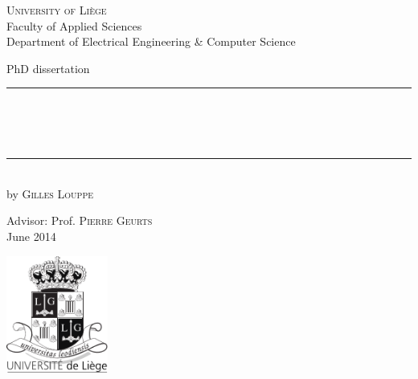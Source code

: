 
\begin{titlepage}
	\begin{addmargin}[-1cm]{-3cm}
    \begin{center}
        \large
        {\Large \textsc{University of Li{\`e}ge}}\\[1ex]
        Faculty of Applied Sciences\\
        Department of Electrical Engineering \& Computer Science\\

        \vfill

        PhD dissertation\\ \vskip1cm
        \rule{14cm}{0.4pt}\\ \bigskip
        \begingroup
            \Large
            \color{Maroon}\spacedallcaps{\myTitle} \\ \bigskip
        \endgroup
        \spacedlowsmallcaps{\mySubtitle} \\ \bigskip
        \rule{14cm}{0.4pt}\\ \vskip1cm
        by \textsc{Gilles Louppe}

        \vfill
        \vfill
        \vfill

        \hfill Advisor: Prof. \textsc{Pierre Geurts}\\
        \hfill June 2014
    \end{center}
    \vspace{-3.5cm}\includegraphics[width=0.25\textwidth]{figures/blason.pdf}
  \end{addmargin}
\end{titlepage}
